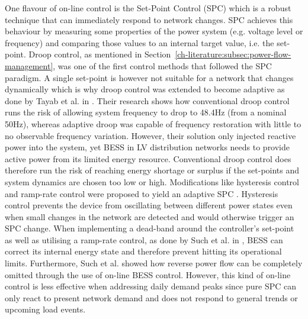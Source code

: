 One flavour of on-line control is the Set-Point Control (SPC) which is a robust technique that can immediately respond to network changes.
SPC achieves this behaviour by measuring some properties of the power system (e.g. voltage level or frequency) and comparing those values to an internal target value, i.e. the set-point.
Droop control, as mentioned in Section~\ref{ch-literature:subsec:power-flow-management}, was one of the first control methods that followed the SPC paradigm.
A single set-point is however not suitable for a network that changes dynamically which is why droop control was extended to become adaptive as done by Tayab et al. in \cite{Tayab2017}.
Their research shows how conventional droop control runs the risk of allowing system frequency to drop to 48.4Hz (from a nominal 50Hz), whereas adaptive droop was capable of frequency restoration with little to no observable frequency variation.
However, their solution only injected reactive power into the system, yet BESS in LV distribution networks needs to provide active power from its limited energy resource.
Conventional droop control does therefore run the risk of reaching energy shortage or surplus if the set-points and system dynamics are chosen too low or high.
Modifications like hysteresis control and ramp-rate control were proposed to yield an adaptive SPC \cite{Blaabjerg2006, Malesani1990, Xu2011a, Such2012}.
Hysteresis control prevents the device from oscillating between different power states even when small changes in the network are detected and would otherwise trigger an SPC change.
When implementing a dead-band around the controller's set-point as well as utilising a ramp-rate control, as done by Such et al. in \cite{Such2012}, BESS can correct its internal energy state and therefore prevent hitting its operational limits.
Furthermore, Such et al. showed how reverse power flow can be completely omitted through the use of on-line BESS control.
However, this kind of on-line control is less effective when addressing daily demand peaks since pure SPC can only react to present network demand and does not respond to general trends or upcoming load events.

